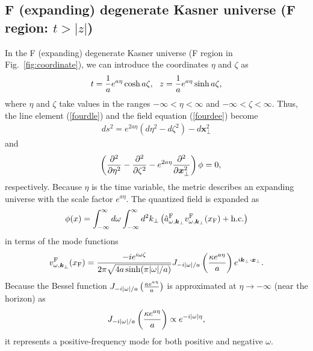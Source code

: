 \documentclass[aps,prd,preprintnumbers,nofootinbib,showpacs,11pt]{revtex4}%
\begin{document}
\begin{widetext}
\subsection{F (expanding) degenerate Kasner universe (F region: $t>|z|$)}
In the F (expanding) degenerate Kasner universe
(F region in Fig.~\ref{fig:coordinate}), 
we can introduce the coordinates $\eta$ and $\zeta$ as
\begin{eqnarray}
t={1\over a}e^{a\eta}\cosh a\zeta,~~
z={1\over a}e^{a\eta}\sinh a\zeta,
\end{eqnarray}
where $\eta$ and $\zeta$ take values in the ranges $-\infty<\eta<\infty$ and 
$-\infty<\zeta<\infty$. Thus, the line element (\ref{fourdle}) and
the field equation (\ref{fourdee}) become
\begin{eqnarray}
ds^2=e^{2a\eta}(d\eta^2-d\zeta^2)-d\bm x_\perp^2
\end{eqnarray}
and
\begin{eqnarray}
&&\left({\partial^2\over \partial \eta^2}-{\partial^2\over \partial \zeta^2}
-e^{2a\eta}{\partial^2\over \partial \bm x_\perp^2}\right)\phi=0,
\label{fourdeF}
\end{eqnarray}
respectively. Because $\eta$ is the time variable, the metric describes an expanding universe with the 
scale factor $e^{a \eta}$.
 The quantized field is expanded as 
\begin{eqnarray}
\phi(x)=\int_{-\infty}^{\infty} 
d \omega\int_{-\infty}^{\infty} d^2k_\perp \left( {\hat a}_{\omega,{\bm k}_\perp}^\F v_{\omega,{\bm k}_\perp}^\F(x_\F)
+{\rm h.c.}
\right)
\label{qfF}
\end{eqnarray}
in terms of the mode functions 
\begin{eqnarray}
v_{\omega,{\bm k}_\perp}^\F(x_\F)={-ie^{i\omega\zeta}\over 2\pi\sqrt{4a\sinh (\pi |\omega|/a)}}
J_{-i|\omega|/a}\left({\kappa e^{a\eta}\over a}\right)
e^{i\bm k_\perp\cdot \bm x_\perp}.
\label{qfRR}
\end{eqnarray}
Because the Bessel function $J_{-i|\omega|/a}\left({\kappa e^{a\eta}\over a}\right)$ 
is approximated at $\eta \rightarrow -\infty$ (near the horizon) as
\begin{eqnarray}
J_{-i|\omega|/a}\left({\kappa e^{a\eta}\over a}\right) 
\propto  e^{-i |\omega| \eta},
\end{eqnarray}
it represents a positive-frequency mode for both positive and negative $\omega$.

\end{widetext}
\end{document}
